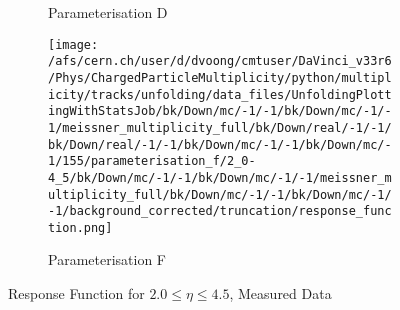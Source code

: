 \begin{figure}[H]
\begin{subfigure}{0.49\textwidth}
		\caption{Parameterisation D}
	\end{subfigure}
	\begin{subfigure}{0.49\textwidth}
		\texttt{[image: /afs/cern.ch/user/d/dvoong/cmtuser/DaVinci\_v33r6/Phys/ChargedParticleMultiplicity/python/multiplicity/tracks/unfolding/data\_files/UnfoldingPlottingWithStatsJob/bk/Down/mc/-1/-1/bk/Down/mc/-1/-1/meissner\_multiplicity\_full/bk/Down/real/-1/-1/bk/Down/real/-1/-1/bk/Down/mc/-1/-1/bk/Down/mc/-1/155/parameterisation\_f/2\_0-4\_5/bk/Down/mc/-1/-1/bk/Down/mc/-1/-1/meissner\_multiplicity\_full/bk/Down/mc/-1/-1/bk/Down/mc/-1/-1/background\_corrected/truncation/response\_function.png]}
		\caption{Parameterisation F}
	\end{subfigure}
	\caption{Response Function for $2.0 \le \eta \le 4.5$, Measured Data}
	\label{fig: response function, measured data}
\end{figure}

